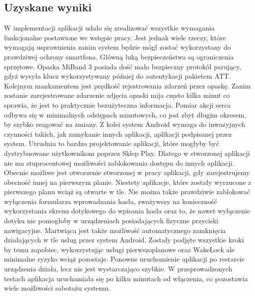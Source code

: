 \subsection{Uzyskane wyniki}
W implementacji aplikacji udało się zrealizować wszystkie wymagania funkcjonalne postawione we wstępie pracy. Jest jednak wiele rzeczy, które wymagają usprawnienia zanim system będzie mógł zostać wykorzystany do prawdziwej ochrony smartfona. Główną luką bezpieczeństwa są ograniczenia sprzętowe. 
\newline\newline
\indent Opaska MiBand 3 posiada dość mało bezpieczny protokół parujący, gdyż wysyła klucz wykorzystywany później do autentykacji pakietem ATT. Kolejnym mankamentem jest prędkość rejestrowania zdarzeń przez opaskę. Zanim zostanie zarejestrowane zdarzenie zdjęcia opaski mija często kilka minut co sprawia, że jest to praktycznie bezużyteczna informacja. Pomiar akcji serca odbywa się w minimalnych  odstępach minutowych, co jest zbyt długim okresem, by szybko reagować na zmiany. 
\newline\newline
\indent Z kolei system Android wymaga do inwazyjnych czynności takich, jak zamykanie innych aplikacji, aplikacji podpisanej przez system. Utrudnia to bardzo projektowanie aplikacji, które mogłyby być dystrybuowane użytkownikom poprzez Sklep Play. Dlatego w stworzonej aplikacji nie ma stuprocentowej możliwości zablokowania dostępu do innych aplikacji. Obecnie możliwe jest otworzenie stworzonej w pracy aplikacji, gdy zarejestrujemy obecność innej na pierwszym planie. Niestety aplikacje, które zostały wyrzucone z pierwszego planu wciąż są otwarte w tle. Nie można także prawdziwie zablokować wyłączenia formularza wprowadzania hasła, zważywszy na konieczność wykorzystania ekrenu dotykowego do wpisania hasła oraz to, że nawet wyłączenie dotyku nie pomogłoby w urządzeniach posiadających fizyczne przyciski nawigacyjne. Martwiąca jest także możliwość automatycznego zamknięcia działających w tle usług przez system Android. Zostały podjęte wszystkie kroki by temu zapobiec, wykorzystując usługi pierwszoplanowe oraz WakeLock ale minimalne ryzyko wciąż pozostaje. Ponowne uruchomienie aplikacji po restarcie urządzenia działa, lecz nie jest wystarczająco szybkie. W przeprowadzonych testach aplikacja uruchamiała się po kilku minutach od włączenia, co pozostawia wiele możliwości sabotażu systemu.
